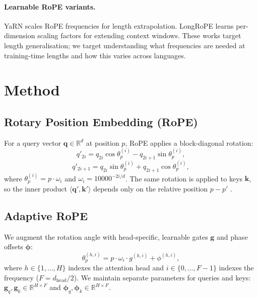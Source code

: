 \documentclass[conference]{IEEEtran}
\begin{document}
\paragraph{Learnable RoPE variants.}
YaRN \cite{peng2023yarn} scales RoPE frequencies for length extrapolation.
LongRoPE \cite{ding2024longrope} learns per-dimension scaling factors for
extending context windows. These works target length generalisation; we target
understanding what frequencies are needed at training-time lengths and how this
varies across languages.

\section{Method}
\label{sec:method}

\subsection{Rotary Position Embedding (RoPE)}

For a query vector $\mathbf{q} \in \mathbb{R}^d$ at position $p$, RoPE applies
a block-diagonal rotation:
\begin{equation}
  q'_{2i}   = q_{2i}\cos\theta_p^{(i)} - q_{2i+1}\sin\theta_p^{(i)},
\end{equation}
\begin{equation}
  q'_{2i+1} = q_{2i}\sin\theta_p^{(i)} + q_{2i+1}\cos\theta_p^{(i)},
\end{equation}
where $\theta_p^{(i)} = p \cdot \omega_i$ and $\omega_i =
10000^{-2i/d}$. The same rotation is applied to keys $\mathbf{k}$, so the
inner product $\langle \mathbf{q}', \mathbf{k}' \rangle$ depends only on the
relative position $p - p'$ \cite{su2021roformer}.

\subsection{Adaptive RoPE}

We augment the rotation angle with head-specific, learnable gates $\mathbf{g}$
and phase offsets $\boldsymbol{\phi}$:
\begin{equation}
  \theta_p^{(h,i)} = p \cdot \omega_i \cdot g^{(h,i)} + \phi^{(h,i)},
  \label{eq:adaptive_rope}
\end{equation}
where $h \in \{1,\ldots,H\}$ indexes the attention head and $i \in
\{0,\ldots,F{-}1\}$ indexes the frequency ($F = d_{\text{head}}/2$). We
maintain separate parameters for queries and keys:
$\mathbf{g}_q, \mathbf{g}_k \in \mathbb{R}^{H \times F}$ and
$\boldsymbol{\phi}_q, \boldsymbol{\phi}_k \in \mathbb{R}^{H \times F}$.
\end{document}
